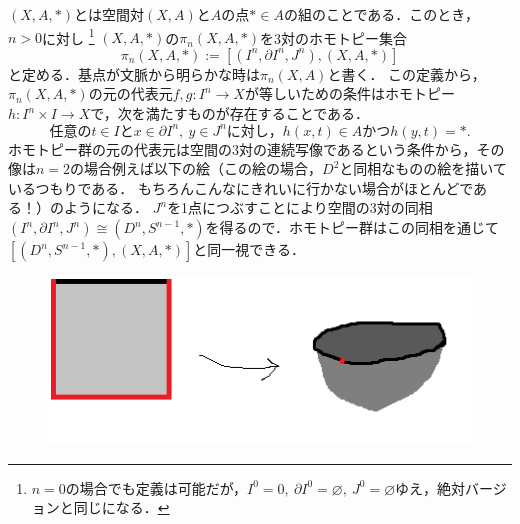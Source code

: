 \documentclass[a4paper,11pt]{jsarticle}
\theoremstyle{definition}
\begin{document}
$(X,A,*)$とは空間対$(X,A)$と$A$の点$*\in A$の組のことである．このとき，$n>0$に対し
\footnote{$n=0$の場合でも定義は可能だが，$I^0={0},\ \partial I^0=\varnothing,\ J^0=\varnothing$ゆえ，絶対バージョンと同じになる．}
$(X,A,*)$の$\pi_n(X,A,*)$を3対のホモトピー集合\[
  \pi_n(X,A,*):=[(I^n,\partial I^n,J^n),(X,A,*)]
\]と定める．基点が文脈から明らかな時は$\pi_n(X,A)$と書く．
この定義から，$\pi_n(X,A,*)$の元の代表元$f,g\colon I^n\to X$が等しいための条件はホモトピー$h\colon I^n\times I\to X$で，次を満たすものが存在することである．\[
  任意のt\in Iとx\in \partial I^n,\ y\in J^nに対し，h(x,t)\in Aかつh(y,t)=*.
\]
ホモトピー群の元の代表元は空間の3対の連続写像であるという条件から，その像は$n=2$の場合例えば以下の絵（この絵の場合，$D^2$と同相なものの絵を描いているつもりである．
もちろんこんなにきれいに行かない場合がほとんどである！）のようになる．
$J^n$を1点につぶすことにより空間の3対の同相$(I^n,\partial I^n,J^n)\cong(D^n,S^{n-1},*)$を得るので．ホモトピー群はこの同相を通じて$[(D^n,S^{n-1},*),(X,A,*)]$と同一視できる．

\begin{figure}[h]
  \centering
  \includegraphics[]{I^2.png}
\end{figure}
\end{document}
